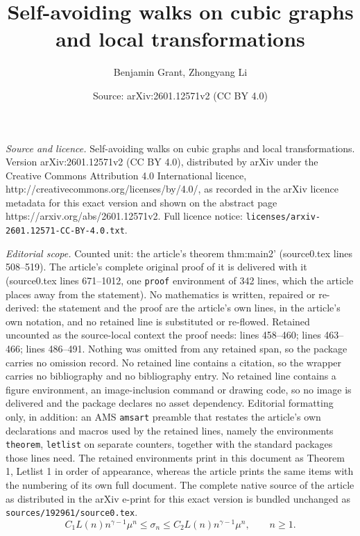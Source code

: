 \documentclass[10pt,a4paper]{amsart}
\title{Self-avoiding walks on cubic graphs and local transformations}
\author{Benjamin Grant, Zhongyang Li}
\date{Source: arXiv:2601.12571v2 (CC BY 4.0)}
\begin{document}
\maketitle

\noindent\emph{Source and licence.} Self-avoiding walks on cubic graphs and local transformations. Version arXiv:2601.12571v2 (CC BY 4.0), distributed by arXiv under the Creative Commons Attribution 4.0 International licence, http://creativecommons.org/licenses/by/4.0/, as recorded in the arXiv licence metadata for this exact version and shown on the abstract page https://arxiv.org/abs/2601.12571v2. Full licence notice: \texttt{licenses/arxiv-2601.12571-CC-BY-4.0.txt}.\par\smallskip

\noindent\textit{Editorial scope.} Counted unit: the article's theorem thm:main2' (source0.tex lines 508--519). The article's complete original proof of it is delivered with it (source0.tex lines 671--1012, one \texttt{proof} environment of 342 lines, which the article places away from the statement). No mathematics is written, repaired or re-derived: the statement and the proof are the article's own lines, in the article's own notation, and no retained line is substituted or re-flowed.  Retained uncounted as the source-local context the proof needs: lines 458--460; lines 463--466; lines 486--491.  Nothing was omitted from any retained span, so the package carries no omission record.  No retained line contains a citation, so the wrapper carries no bibliography and no bibliography entry.  No retained line contains a figure environment, an image-inclusion command or drawing code, so no image is delivered and the package declares no asset dependency.  Editorial formatting only, in addition: an AMS \texttt{amsart} preamble that restates the article's own declarations and macros used by the retained lines, namely the environments \texttt{theorem}, \texttt{letlist} on separate counters, together with the standard packages those lines need.  The retained environments print in this document as Theorem 1, Letlist 1 in order of appearance, whereas the article prints the same items with the numbering of its own full document.  The complete native source of the article as distributed in the arXiv e-print for this exact version is bundled unchanged as \texttt{sources/192961/source0.tex}.
\begin{equation}\label{def:slow}
C_1 L(n)n^{\gamma-1}\mu^n\leq \sigma_{n}\leq C_2 L(n)n^{\gamma-1}\mu^n, \qquad n \ge 1.
\end{equation}
\end{document}
